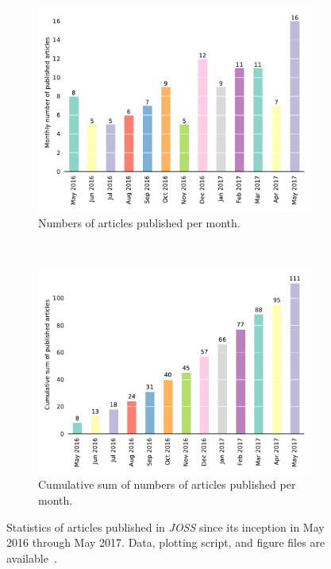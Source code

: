 \documentclass{article}
\newcommand\joss{\textit{JOSS}}
\begin{document}
\begin{figure}[htbp]
    \centering
    \begin{subfigure}[b]{0.7\textwidth}
        \includegraphics[width=\textwidth]{JOSS-published-articles.pdf}
        \caption{Numbers of articles published per month.}
    \end{subfigure}
    \\
    \begin{subfigure}[b]{0.7\textwidth}
        \includegraphics[width=\textwidth]{JOSS-cumsum-published-articles.pdf}
        \caption{Cumulative sum of numbers of articles published per month.}
    \end{subfigure}
    \caption{Statistics of articles published in \joss{} since its inception in May 2016 through May 2017.
    Data, plotting script, and figure files are available~\cite{JOSS-data-figs}.}
    \label{fig:article_stats}
\end{figure}
\end{document}
